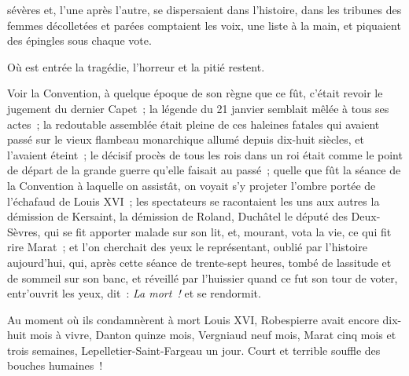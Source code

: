 \documentclass[french,twoside]{book} %
\def\mednobreak{\ifdim\lastskip<\medskipamount
  \removelastskip\nopagebreak\medskip\fi}
\newcommand{\labelblock}[1]{\medbreak{\noindent\color{rubric}\bfseries #1}\par\mednobreak}
\begin{document}
sévères et, l’une après l’autre, se dispersaient dans l’histoire, dans les tribunes des femmes décolletées et parées comptaient les voix, une liste à la main, et piquaient des épingles sous chaque vote.\par
Où est entrée la tragédie, l’horreur et la pitié restent.\par
Voir la Convention, à quelque époque de son règne que ce fût, c’était revoir le jugement du dernier Capet ; la légende du 21 janvier semblait mêlée à tous ses actes ; la redoutable assemblée était pleine de ces haleines fatales qui avaient passé sur le vieux flambeau monarchique allumé depuis dix-huit siècles, et l’avaient éteint ; le décisif procès de tous les rois dans un roi était comme le point de départ de la grande guerre qu’elle faisait au passé ; quelle que fût la séance de la Convention à laquelle on assistât, on voyait s’y projeter l’ombre portée de l’échafaud de Louis XVI ; les spectateurs se racontaient les uns aux autres la démission de Kersaint, la démission de Roland, Duchâtel le député des Deux-Sèvres, qui se fit apporter malade sur son lit, et, mourant, vota la vie, ce qui fit rire Marat ; et l’on cherchait des yeux le représentant, oublié par l’histoire aujourd’hui, qui, après cette séance de trente-sept heures, tombé de lassitude et de sommeil sur son banc, et réveillé par l’huissier quand ce fut son tour de voter, entr’ouvrit les yeux, dit : \emph{La mort !} et se rendormit.\par
Au moment où ils condamnèrent à mort Louis XVI,  Robespierre avait encore dix-huit mois à vivre, Danton quinze mois, Vergniaud neuf mois, Marat cinq mois et trois semaines, Lepelletier-Saint-Fargeau un jour. Court et terrible souffle des bouches humaines !\par

\labelblock{viii}
\end{document}
